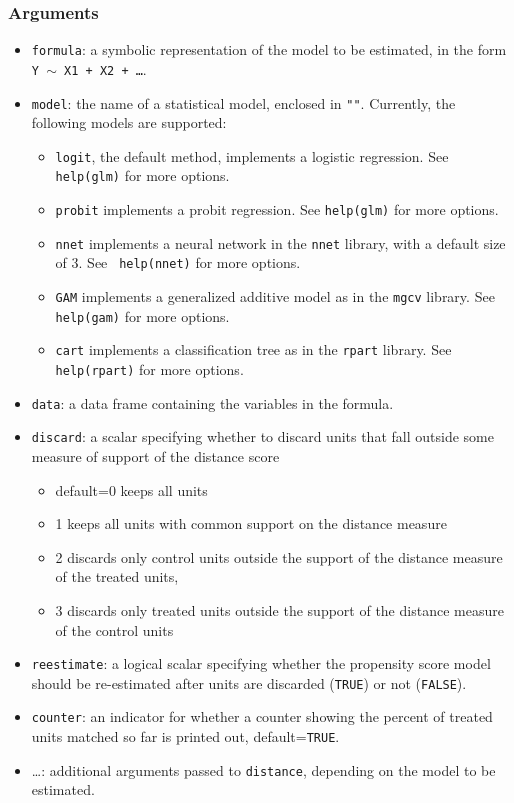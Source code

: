 \documentclass[oneside,letterpaper,titlepage]{article}
\begin{document}
\begin{appendix}
\subsubsection{Arguments}
\begin{itemize}
\item{\texttt{formula}}: a symbolic representation of the model to be
  estimated, in the form {\tt Y $\sim$ X1 + X2 + \dots}.
\item \texttt{model}: the name of a statistical model, enclosed in {\tt ""}.
  Currently, the following models are supported:
  \begin{itemize}
  \item \texttt{logit}, the default method, implements a logistic
    regression.  See {\tt help(glm)} for more options.
  \item \texttt{probit} implements a probit regression.  See
    {\tt help(glm)} for more options. 
  \item \texttt{nnet} implements a neural network in the
    \texttt{nnet} library, with a default size of 3.  See {\tt
      help(nnet)} for more options.
  \item \texttt{GAM} implements a generalized additive model 
    as in the \texttt{mgcv} library.  See
    {\tt help(gam)} for more options.
  \item \texttt{cart} implements a classification tree as in the
    \texttt{rpart} library.  See {\tt help(rpart)} for more
    options.  
  \end{itemize}
\item \texttt{data}: a data frame containing the variables in the formula.
\item \texttt{discard}: a scalar specifying whether to discard units that fall
  outside some measure of support of the distance score
  \begin{itemize}
  \item default=0 keeps all units
  \item  1 keeps all units with common support on the distance
    measure
  \item 2 discards only control units outside the support of the
    distance measure of the treated units,
  \item 3 discards only treated units outside the support of the
    distance measure of the control units
  \end{itemize}
\item \texttt{reestimate}: a logical scalar specifying whether the propensity
  score model should be re-estimated after units are discarded
  (\texttt{TRUE}) or not (\texttt{FALSE}).
\item \texttt{counter}: an indicator for whether a counter showing the percent of treated units matched so far is printed out, default={\tt TRUE}.
\item{\dots}: additional arguments passed to \texttt{distance}, depending on
    the model to be estimated.
\end{itemize}


\end{appendix}
\end{document}
